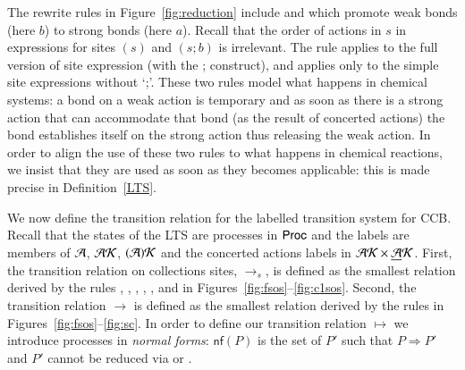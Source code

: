 {The rewrite rules in Figure~\ref{fig:reduction} include 
 and 
which promote weak bonds (here $b$) to strong bonds (here $a$). Recall that the order of actions in $s$ in expressions for sites
$(s)$ and $(s;b)$ is irrelevant.
The rule  applies to the full version of site expression (with the ; construct), and
 applies only to the simple site expressions without `;'.
These two rules model what happens in chemical systems: a bond on a weak action is 
temporary and as soon as there is a strong action that can accommodate that bond (as the result
of concerted actions) the bond establishes itself on the strong action thus releasing the weak action.
In order to align the use of these two rules to what happens in chemical reactions, we insist
that they are used as soon as they becomes applicable: this is made 
precise in Definition~\ref{LTS}.

We now define the transition relation for the labelled transition system for CCB.
Recall that the states of the LTS are processes in $\mathsf{Proc}$ and the labels are members of $\mathcal{A}$,
$\mathcal{AK}$, $\mathcal{(A)K}$ and the concerted actions labels in $\mathcal{AK} \times \underline{\mathcal{A}}\mathcal{K}$.
First, the transition relation on collections sites, $\rightarrow_s$, 
is defined as the smallest relation derived by the rules , ,  , ,   
, and  in Figures~\ref{fig:fsos}--\ref{fig:c1sos}.  Second, the transition relation $\rightarrow$ is defined
as the smallest relation derived by the rules in Figures~\ref{fig:fsos}--\ref{fig:sc}. 
%
In order to define our transition relation $\mapsto$ we introduce processes in \emph{normal forms}: $\mathsf{nf}(P)$ is the set of $P'$ 
such that $P\Rightarrow P'$ and $P'$ cannot be reduced via  or  .



}
